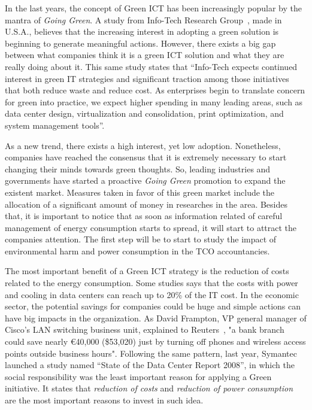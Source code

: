     In the last years, the concept of Green ICT has been increasingly popular by the mantra of \emph{Going Green}. A study from Info-Tech Research Group~\cite{info-tech07}, made in U.S.A., believes that the increasing interest in adopting a green solution is beginning to generate meaningful actions. However, there exists a big gap between what companies think it is a green ICT solution and what they are really doing about it. This same study states that ``Info-Tech expects continued interest in green IT strategies and significant traction among those initiatives that both reduce waste and reduce cost. As enterprises begin to translate concern for green into practice, we expect higher spending in many leading areas, such as data center design, virtualization and consolidation, print optimization, and system management tools''.
    
    As a new trend, there exists a high interest, yet low adoption. Nonetheless, companies have reached the consensus that it is extremely necessary to start changing their minds towards green thoughts. So, leading industries and governments have started a proactive \emph{Going Green} promotion to expand the existent market. Measures taken in favor of this green market include the allocation of a significant amount of money in researches in the area. Besides that, it is important to notice that as soon as information related of careful management of energy consumption starts to spread, it will start to attract the companies attention. The first step will be to start to study the impact of environmental harm and power consumption in the TCO accountancies.
    
    The most important benefit of a Green ICT strategy is the reduction of costs related to the energy consumption. Some studies says that the costs with power and cooling in data centers can reach up to 20\% of the IT cost. In the economic sector, the potential savings for companies could be huge and simple actions can have big impacts in the organization. As David Frampton, VP general manager of Cisco's LAN switching business unit, explained to Reuters~\cite{Chestney2009}, "a bank branch could save nearly \euro40,000 (\$53,020) just by turning off phones and wireless access points outside business hours". Following the same pattern, last year, Symantec launched a study named ``State of the Data Center Report 2008'', in which the social responsibility was the least important reason for applying a Green initiative. It states that \emph{reduction of costs} and \emph{reduction of power consumption} are the most important reasons to invest in such idea. 
    
